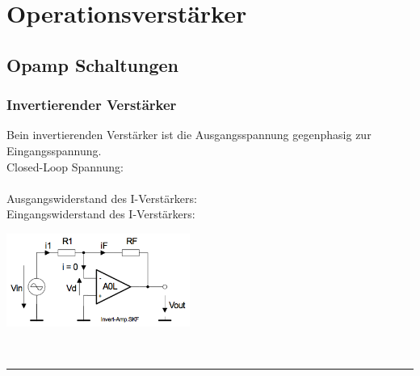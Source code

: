 \section{Operationsverstärker }
		\subsection{Opamp Schaltungen}
		\subsubsection{Invertierender Verstärker }
			\begin{minipage}[T]{12cm}
          	  Bein invertierenden Verstärker ist die Ausgangsspannung gegenphasig
            	zur Eingangsspannung.\\
            	Closed-Loop Spannung:
            	\hspace{23mm}\\
            	\hspace*{10mm}
           		\hspace{29.5mm}\\
            	Ausgangswiderstand des I-Verstärkers: \\
            	Eingangswiderstand des I-Verstärkers:
            	\hspace{0.5mm}
            \end{minipage}
			\begin{minipage}{6cm}
            	\includegraphics[width=6cm]{./bilder/i-verstaerker.png}
            \end{minipage}\\

\hrule


